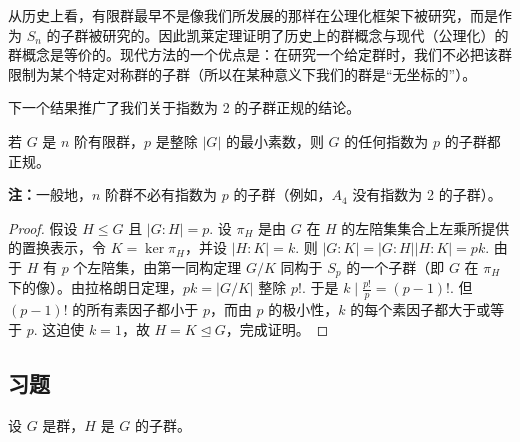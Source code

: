 从历史上看，有限群最早不是像我们所发展的那样在公理化框架下被研究，而是作为 \(S_n\) 的子群被研究的。因此凯莱定理证明了历史上的群概念与现代（公理化）的群概念是等价的。现代方法的一个优点是：在研究一个给定群时，我们不必把该群限制为某个特定对称群的子群（所以在某种意义下我们的群是“无坐标的”）。

下一个结果推广了我们关于指数为 2 的子群正规的结论。

\begin{corollary}\label{cor:4.5}
若 \(G\) 是 \(n\) 阶有限群，\(p\) 是整除 \(|G|\) 的最小素数，则 \(G\) 的任何指数为 \(p\) 的子群都正规。
\end{corollary}

\textbf{注：}一般地，\(n\) 阶群不必有指数为 \(p\) 的子群（例如，\(A_4\) 没有指数为 2 的子群）。

\begin{proof}
假设 \(H \leq G\) 且 \(|G : H| = p\). 设 \(\pi_H\) 是由 \(G\) 在 \(H\) 的左陪集集合上左乘所提供的置换表示，令 \(K = \ker \pi_H\)，并设 \(|H : K| = k\). 则 \(|G : K| = |G : H||H : K| = pk\). 由于 \(H\) 有 \(p\) 个左陪集，由第一同构定理 \(G/K\) 同构于 \(S_p\) 的一个子群（即 \(G\) 在 \(\pi_H\) 下的像）。由拉格朗日定理，\(pk = |G/K|\) 整除 \(p!\). 于是 \(k \mid \frac{p!}{p} = (p-1)!\). 但 \((p-1)!\) 的所有素因子都小于 \(p\)，而由 \(p\) 的极小性，\(k\) 的每个素因子都大于或等于 \(p\). 这迫使 \(k = 1\)，故 \(H = K \trianglelefteq G\)，完成证明。
\end{proof}

\subsection*{习题}
设 \(G\) 是群，\(H\) 是 \(G\) 的子群。

